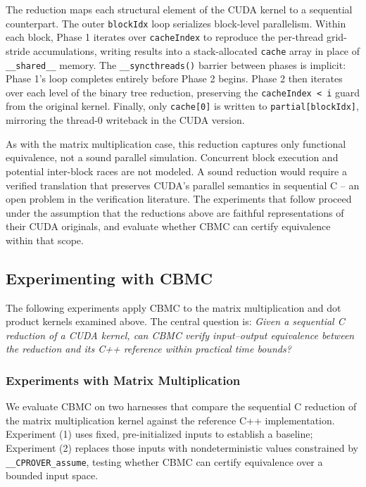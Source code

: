 \documentclass{article}
\begin{document}
The reduction maps each structural element of the CUDA kernel to a sequential counterpart. The outer \texttt{blockIdx} loop serializes block-level parallelism. Within each block, Phase 1 iterates over \texttt{cacheIndex} to reproduce the per-thread grid-stride accumulations, writing results into a stack-allocated \texttt{cache} array in place of \texttt{\_\_shared\_\_} memory. The \texttt{\_\_syncthreads()} barrier between phases is implicit: Phase 1's loop completes entirely before Phase 2 begins. Phase 2 then iterates over each level of the binary tree reduction, preserving the \texttt{cacheIndex < i} guard from the original kernel. Finally, only \texttt{cache[0]} is written to \texttt{partial[blockIdx]}, mirroring the thread-0 writeback in the CUDA version.

As with the matrix multiplication case, this reduction captures only functional equivalence, not a sound parallel simulation. Concurrent block execution and potential inter-block races are not modeled. A sound reduction would require a verified translation that preserves CUDA's parallel semantics in sequential C -- an open problem in the verification literature. The experiments that follow proceed under the assumption that the reductions above are faithful representations of their CUDA originals, and evaluate whether CBMC can certify equivalence within that scope.

\subsection{Experimenting with CBMC}

The following experiments apply CBMC to the matrix multiplication and dot product kernels examined above. The central question is: \textit{Given a sequential C reduction of a CUDA kernel, can CBMC verify input--output equivalence between the reduction and its C++ reference within practical time bounds?}

\subsubsection{Experiments with Matrix Multiplication}

We evaluate CBMC on two harnesses that compare the sequential C reduction of the matrix multiplication kernel against the reference C++ implementation. Experiment (1) uses fixed, pre-initialized inputs to establish a baseline; Experiment (2) replaces those inputs with nondeterministic values constrained by \texttt{\_\_CPROVER\_assume}, testing whether CBMC can certify equivalence over a bounded input space.
\end{document}
